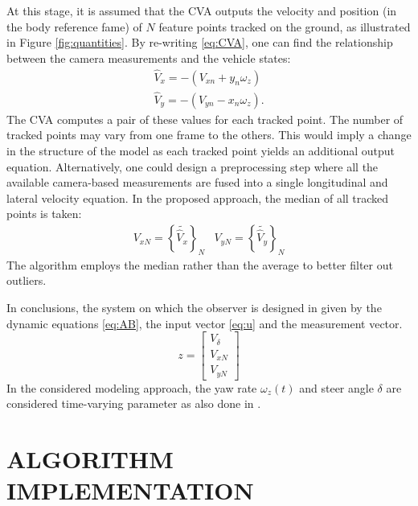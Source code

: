 \documentclass[letterpaper, 10 pt, conference]{ieeeconf}
\begin{document}
At this stage, it is assumed that the CVA outputs the velocity and position (in the body reference fame) of  $N$ feature points tracked on the ground, as illustrated in Figure \ref{fig:quantities}. By re-writing \eqref{eq:CVA}, one can find the relationship between the camera measurements and the vehicle states: 
\begin{equation}
\begin{array}{l} 
{\hat V_x} =  - \left( {{V_{xn}} + {y_n}{\omega _z}} \right) \\
{\hat V_y} =  - \left( {{V_{yn}} - {x_n}{\omega _z}} \right).
\end{array}	
\label{eq:CVA2}
\end{equation}
The CVA computes a pair of these values for each tracked point. The number of tracked points may vary from one frame to the others.  This would imply a change in the structure of the model as each tracked point yields an additional output equation. Alternatively, one could design a preprocessing step where all the available camera-based measurements are fused into a single longitudinal and lateral velocity equation. In the proposed approach, the median of all tracked points is taken:
\begin{equation}\label{eq:VN}
\begin{array}{*{20}{c}}
  {{V_{xN}} = {{\left\{ {\widetilde {{{\hat V}_x}}} \right\}}_N}}&{{V_{yN}} = {{\left\{ {\widetilde {{{\hat V}_y}}} \right\}}_N}} 
\end{array}
\end{equation}
The algorithm employs the median rather than the average to better filter out outliers.

In conclusions, the system on which the observer is designed in given by the dynamic equations \eqref{eq:AB}, the input vector \cref{eq:u} and the measurement vector.
\begin{equation}
z= 
\begin{bmatrix}
  {{V_\delta }} \\ 
  {{V_{xN}}} \\ 
  {{V_{yN}}} 
\end{bmatrix}
\label{eq:z}
\end{equation}
In the considered modeling approach, the yaw rate $\omega_z(t)$ and steer angle $\delta$ are considered time-varying parameter as also done in \cite{farrelly1996estimation,selmanajvehicle2016}.

\section{ALGORITHM IMPLEMENTATION}\label{sec:implement}
\end{document}
